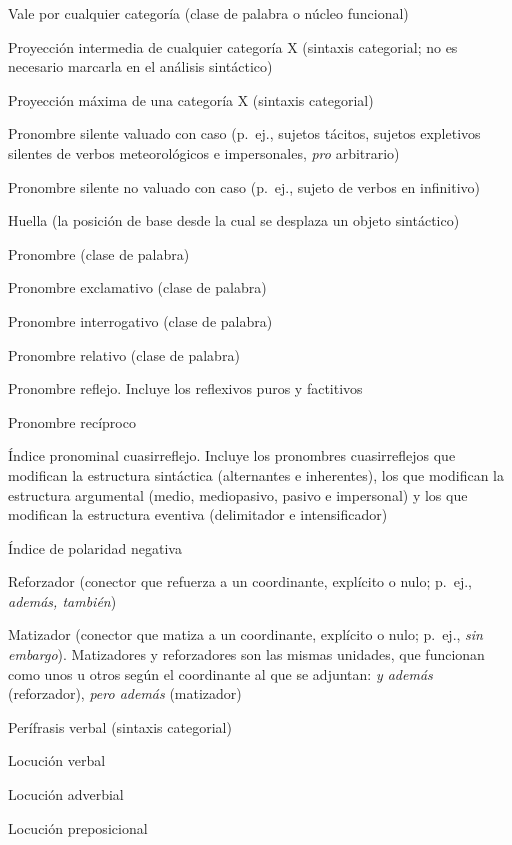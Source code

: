 \begin{siglario}
  \item[X] Vale por cualquier categoría (clase de palabra o núcleo funcional)
  \item[X\prima] Proyección intermedia de cualquier categoría X (sintaxis
        categorial; no es necesario marcarla en el análisis sintáctico)
  \item[SX] Proyección máxima de una categoría X (sintaxis categorial)
\end{siglario}

\begin{siglario}
  \item[\textit{pro}] Pronombre silente valuado con caso (p.~ej., sujetos
        tácitos, sujetos expletivos silentes de verbos meteorológicos e
        impersonales, \textit{pro} arbitrario)
  \item[PRO] Pronombre silente no valuado con caso (p.~ej., sujeto de verbos en
        infinitivo)
  \item[h] Huella (la posición de base desde la cual se desplaza un objeto
        sintáctico)
\end{siglario}

\begin{siglario}
  \item[Pr] Pronombre (clase de palabra)
  \item[PrEx] Pronombre exclamativo (clase de palabra)
  \item[PrInt] Pronombre interrogativo (clase de palabra)
  \item[R] Pronombre relativo (clase de palabra)
  \item[PRefl] Pronombre reflejo. Incluye los reflexivos puros y factitivos
  \item[PRecipr] Pronombre recíproco
  \item[IPCR] Índice pronominal cuasirreflejo. Incluye los pronombres
        cuasirreflejos que modifican la estructura sintáctica (alternantes e
        inherentes), los que modifican la estructura argumental (medio,
        mediopasivo, pasivo e impersonal) y los que modifican la estructura
        eventiva (delimitador e intensificador)
  \item[IPN] Índice de polaridad negativa
  \item[Ref] Reforzador (conector que refuerza a un coordinante, explícito o
        nulo; p.~ej., \textit{además, también})
  \item[Mat] Matizador (conector que matiza a un coordinante, explícito o nulo;
        p.~ej., \textit{sin embargo}). Matizadores y reforzadores son las mismas
        unidades, que funcionan como unos u otros según el coordinante al que se
        adjuntan: \textit{y además} (reforzador), \textit{pero además}
        (matizador)
  \item[PV] Perífrasis verbal (sintaxis categorial)
  \item[LV] Locución verbal
  \item[LAdv] Locución adverbial
  \item[LP] Locución preposicional
\end{siglario}

